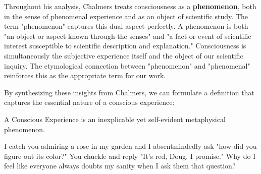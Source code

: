 \documentclass[runningheads]{llncs}
\begin{document}
Throughout his analysis, Chalmers treats consciousness as a \textbf{phenomenon}, both in the sense of phenomenal experience and as an object of scientific study. The term "phenomenon" captures this dual aspect perfectly. A phenomenon is both "an object or aspect known through the senses" and "a fact or event of scientific interest susceptible to scientific description and explanation." Consciousness is simultaneously the subjective experience itself and the object of our scientific inquiry. The etymological connection between "phenomenon" and "phenomenal" reinforces this as the appropriate term for our work.

By synthesizing these insights from Chalmers, we can formulate a definition that captures the essential nature of a conscious experience:

\setcounter{definition}{0}
\begin{cdefinition}
	A Conscious Experience is an inexplicable yet self-evident metaphysical phenomenon.
\end{cdefinition}

\setcounter{definition}{0}
\begin{cexample}
I catch you admiring a rose in my garden and I absentmindedly ask "how did you figure out its color?" You chuckle and reply "It's red, Doug. I promise." Why do I feel like everyone always doubts my sanity when I ask them that question?
\end{cexample}


\end{document}
